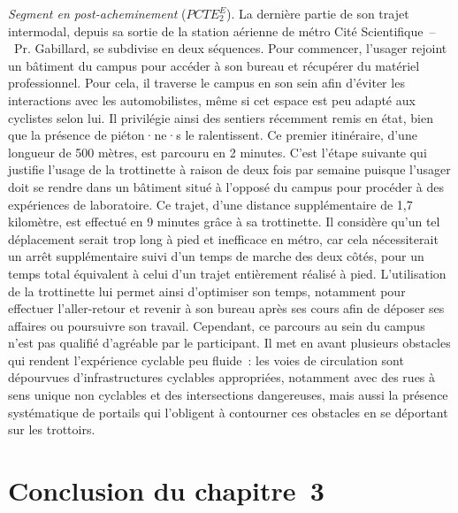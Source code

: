 \begin{refsegment}
\textsl{Segment en post-acheminement} (\(PCTE^{E}_{2}\)). La dernière partie de son trajet intermodal, depuis sa sortie de la station aérienne de métro Cité Scientifique~–~Pr. Gabillard, se subdivise en deux séquences. Pour commencer, l’usager rejoint un bâtiment du campus pour accéder à son bureau et récupérer du matériel professionnel. Pour cela, il traverse le campus en son sein afin d’éviter les interactions avec les automobilistes, même si cet espace est peu adapté aux cyclistes selon lui. Il privilégie ainsi des sentiers récemment remis en état, bien que la présence de piéton·ne·s le ralentissent. Ce premier itinéraire, d’une longueur de 500 mètres, est parcouru en 2 minutes. C'est l'étape suivante qui justifie l’usage de la trottinette à raison de deux fois par semaine puisque l’usager doit se rendre dans un bâtiment situé à l’opposé du campus pour procéder à des expériences de laboratoire. Ce trajet, d’une distance supplémentaire de 1,7 kilomètre, est effectué en 9 minutes grâce à sa trottinette. Il considère qu’un tel déplacement serait trop long à pied et inefficace en métro, car cela nécessiterait un arrêt supplémentaire suivi d'un temps de marche des deux côtés, pour un temps total équivalent à celui d’un trajet entièrement réalisé à pied. L’utilisation de la trottinette lui permet ainsi d’optimiser son temps, notamment pour effectuer l’aller-retour et revenir à son bureau après ses cours afin de déposer ses affaires ou poursuivre son travail. Cependant, ce parcours au sein du campus n’est pas qualifié d’agréable par le participant. Il met en avant plusieurs obstacles qui rendent l’expérience cyclable peu fluide~: les voies de circulation sont dépourvues d'infrastructures cyclables appropriées, notamment avec des rues à sens unique non cyclables et des intersections dangereuses, mais aussi la présence systématique de portails qui l'obligent à contourner ces obstacles en se déportant sur les trottoirs.%

    \newpage
\section*{Conclusion du chapitre~3
    \label{chap3:conclusion}
    }


\end{refsegment}

